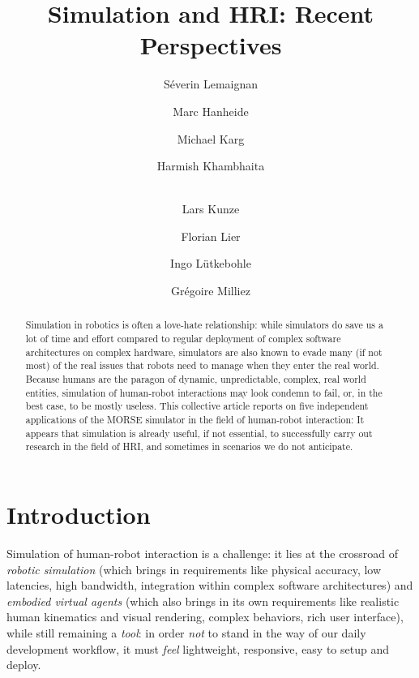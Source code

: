 \documentclass{llncs}
\begin{document}
\title{Simulation and HRI: Recent Perspectives}

\author{
Séverin Lemaignan \and 
Marc Hanheide \and 
Michael Karg \and 
Harmish Khambhaita \and \\
Lars Kunze \and 
Florian Lier \and 
Ingo Lütkebohle \and 
Grégoire Milliez
}





\maketitle

\begin{abstract}

Simulation in robotics is often a love-hate relationship: while simulators do
save us a lot of time and effort compared to regular deployment of complex
software architectures on complex hardware, simulators are also known to evade
many (if not most) of the real issues that robots need to manage when they enter
the real world.  Because humans are the paragon of dynamic, unpredictable,
complex, real world entities, simulation of human-robot interactions may look
condemn to fail, or, in the best case, to be mostly useless. This collective
article reports on five independent applications of the MORSE simulator in the
field of human-robot interaction: It appears that simulation is already useful,
if not essential, to successfully carry out research in the field of HRI, and
sometimes in scenarios we do not anticipate.

\end{abstract}

\section{Introduction}

Simulation of human-robot interaction is a challenge: it lies at the crossroad
of \emph{robotic simulation} (which brings in requirements like physical
accuracy, low latencies, high bandwidth, integration within complex software
architectures) and \emph{embodied virtual agents} (which also brings in its own
requirements like realistic human kinematics and visual rendering, complex
behaviors, rich user interface), while still remaining a \emph{tool}: in order
\emph{not} to stand in the way of our daily development workflow, it must
\emph{feel} lightweight, responsive, easy to setup and deploy.
\end{document}
